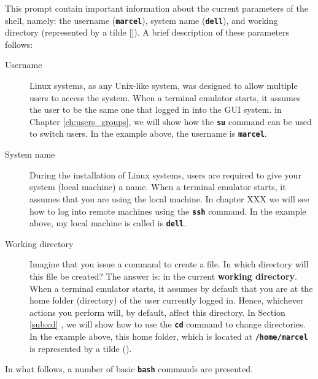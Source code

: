 
This prompt contain important information about the current parameters of the shell, namely: the username (\textbf{\texttt{marcel}}), system name (\textbf{\texttt{dell}}), and working directory (represented by a tilde [\textbf{\texttt{\texttildelow}}]). A brief description of these parameters follows:

\begin{description}
\item [Username] Linux systems, as any Unix-like system, was designed to allow multiple users to access the system. When a terminal emulator starts, it assumes the user to be the same one that logged in into the GUI system. in Chapter \ref{ch:users_groups}, we will show how the \textbf{\texttt{su}} command can be used to switch users. In the example above, the username is \textbf{\texttt{marcel}}.

\item[System name] During the installation of Linux systems,  users are required to give your system (local machine) a name. When a terminal emulator starts, it assumes that you are using the local machine. In chapter XXX we will see how to log into remote machines using the \textbf{\texttt{ssh}} command. In the example above, my local machine is called is \textbf{\texttt{dell}}.

\item[Working directory] Imagine that you issue a command to create a file. In which directory will this file be created? The answer is: in the current \textbf{working directory}. When a terminal emulator starts, it assumes by default that you are at the home folder (directory) of the user currently logged in. Hence, whichever actions you perform will, by default, affect this directory. In Section \ref{sub:cd} , we will show how to use the \textbf{\texttt{cd}} command to change directories. In the example above, this home folder, which is located at \textbf{\texttt{/home/marcel}} is represented by a tilde (\textbf{\texttt{\texttildelow}}).
\end{description}

In what follows, a number of basic \textbf{\texttt{bash}} commands are presented.

